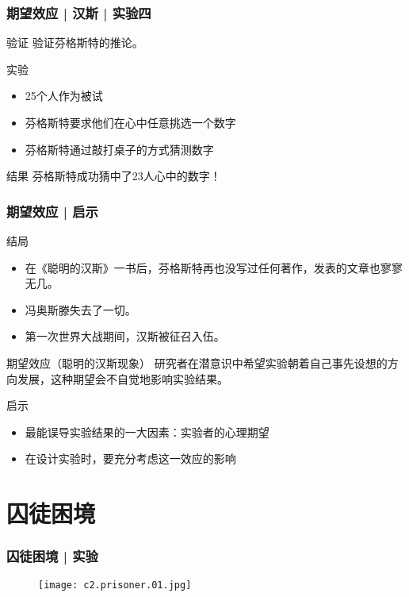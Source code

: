 \begin{frame}
  \frametitle{期望效应 | 汉斯 | 实验四}
  \begin{block}{验证}
    验证芬格斯特的推论。
  \end{block}
  \pause
  \begin{block}{实验}
    \begin{itemize}
      \item 25个人作为被试
      \item 芬格斯特要求他们在心中任意挑选一个数字
      \item 芬格斯特通过敲打桌子的方式猜测数字
    \end{itemize}
  \end{block}
  \pause
  \begin{block}{结果}
    芬格斯特成功猜中了23人心中的数字！
  \end{block}
\end{frame}

\begin{frame}
  \frametitle{期望效应 | 启示}
  \begin{block}{结局}
    \begin{itemize}
      \item 在《聪明的汉斯》一书后，芬格斯特再也没写过任何著作，发表的文章也寥寥无几。
      \item 冯\textbullet 奥斯滕失去了一切。
      \item 第一次世界大战期间，汉斯被征召入伍。
    \end{itemize}
  \end{block}
  \pause
  \begin{block}{\alert{期望效应（聪明的汉斯现象）}}
    研究者在潜意识中希望实验朝着自己事先设想的方向发展，这种期望会不自觉地影响实验结果。
  \end{block}
  \pause
  \begin{block}{\alert{启示}}
    \begin{itemize}
      \item 最能误导实验结果的一大因素：实验者的心理期望
      \item 在设计实验时，要充分考虑这一效应的影响
    \end{itemize}
  \end{block}
\end{frame}

\section{囚徒困境}
\begin{frame}
  \frametitle{囚徒困境 | 实验}
  \begin{figure}
    \centering
    \texttt{[image: c2.prisoner.01.jpg]}
  \end{figure}
\end{frame}

